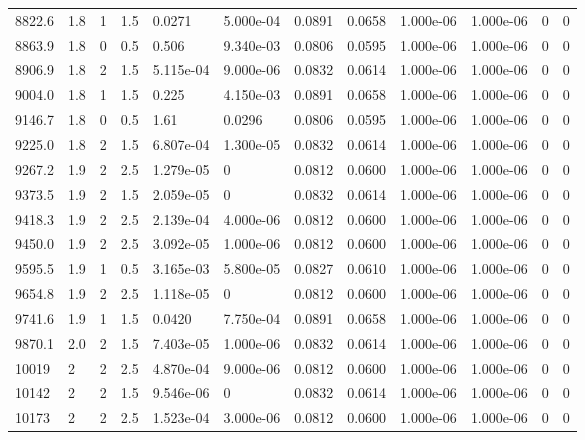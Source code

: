 \documentclass[preview]{standalone}
\begin{document}
{{{{\begin{tabular}{L{1.2cm}C{1.2cm} C{0.3cm}C{0.5cm} C{1.4cm}C{1.4cm} C{1.4cm}C{1.4cm} C{1.6cm}C{1.6cm} C{1.6cm}C{1.6cm}}
  8822.6  &   1.8  & 1     & 1.5 &  0.0271  & 5.000e-04  &  0.0891&   0.0658& 1.000e-06 & 1.000e-06   &  0 & 0  \\ 
  8863.9  &   1.8  & 0     & 0.5 &  0.506  & 9.340e-03  &  0.0806&   0.0595& 1.000e-06 & 1.000e-06   &  0 & 0  \\ 
  8906.9  &   1.8  & 2     & 1.5 &  5.115e-04  & 9.000e-06  &  0.0832&   0.0614& 1.000e-06 & 1.000e-06   &  0 & 0  \\ 
  9004.0  &   1.8  & 1     & 1.5 &  0.225  & 4.150e-03  &  0.0891&   0.0658& 1.000e-06 & 1.000e-06   &  0 & 0  \\ 
  9146.7  &   1.8  & 0     & 0.5 &  1.61  & 0.0296  &  0.0806&   0.0595& 1.000e-06 & 1.000e-06   &  0 & 0  \\ 
  9225.0  &   1.8  & 2     & 1.5 &  6.807e-04  & 1.300e-05  &  0.0832&   0.0614& 1.000e-06 & 1.000e-06   &  0 & 0  \\ 
  9267.2  &   1.9  & 2     & 2.5 &  1.279e-05  & 0  &  0.0812&   0.0600& 1.000e-06 & 1.000e-06   &  0 & 0  \\ 
  9373.5  &   1.9  & 2     & 1.5 &  2.059e-05  & 0  &  0.0832&   0.0614& 1.000e-06 & 1.000e-06   &  0 & 0  \\ 
  9418.3  &   1.9  & 2     & 2.5 &  2.139e-04  & 4.000e-06  &  0.0812&   0.0600& 1.000e-06 & 1.000e-06   &  0 & 0  \\ 
  9450.0  &   1.9  & 2     & 2.5 &  3.092e-05  & 1.000e-06  &  0.0812&   0.0600& 1.000e-06 & 1.000e-06   &  0 & 0  \\ 
  9595.5  &   1.9  & 1     & 0.5 &  3.165e-03  & 5.800e-05  &  0.0827&   0.0610& 1.000e-06 & 1.000e-06   &  0 & 0  \\ 
  9654.8  &   1.9  & 2     & 2.5 &  1.118e-05  & 0  &  0.0812&   0.0600& 1.000e-06 & 1.000e-06   &  0 & 0  \\ 
  9741.6  &   1.9  & 1     & 1.5 &  0.0420  & 7.750e-04  &  0.0891&   0.0658& 1.000e-06 & 1.000e-06   &  0 & 0  \\ 
  9870.1  &   2.0  & 2     & 1.5 &  7.403e-05  & 1.000e-06  &  0.0832&   0.0614& 1.000e-06 & 1.000e-06   &  0 & 0  \\ 
  10019  &     2  & 2     & 2.5 &  4.870e-04  & 9.000e-06  &  0.0812&   0.0600& 1.000e-06 & 1.000e-06   &  0 & 0  \\ 
  10142  &     2  & 2     & 1.5 &  9.546e-06  & 0  &  0.0832&   0.0614& 1.000e-06 & 1.000e-06   &  0 & 0  \\ 
  10173  &     2  & 2     & 2.5 &  1.523e-04  & 3.000e-06  &  0.0812&   0.0600& 1.000e-06 & 1.000e-06   &  0 & 0  \\ 

\end{tabular}}}}}
\end{document}

